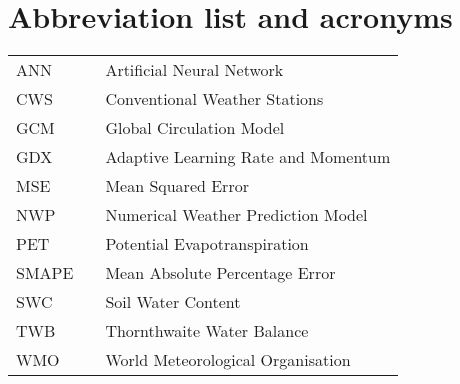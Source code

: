 \chapter*{Abbreviation list and acronyms}

\vspace*{-0.5cm}

\onehalfspacing


\noindent
\begin{tabular}{l c p{.85\linewidth}}
ANN                & & Artificial Neural Network\\

CWS                & & Conventional Weather Stations\\

GCM                & & Global Circulation Model\\

GDX                & & Adaptive Learning Rate and Momentum\\

MSE                & & Mean Squared Error\\ 

NWP                & & Numerical Weather Prediction Model\\

PET                & & Potential Evapotranspiration\\

SMAPE              & & Mean Absolute Percentage Error\\ 

SWC                & & Soil Water Content\\ 

TWB                & & Thornthwaite  Water Balance\\

WMO                & & World Meteorological Organisation\\ 





\end{tabular}

%
 
